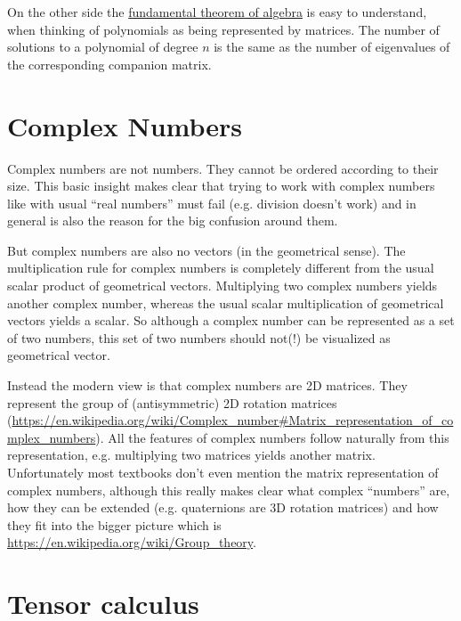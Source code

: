 On the other side the
\href{https://en.wikipedia.org/wiki/Fundamental_theorem_of_algebra}{fundamental
theorem of algebra} is easy to understand, when thinking of polynomials
as being represented by matrices. The number of solutions to a
polynomial of degree $n$ is the same as the number of eigenvalues of
the corresponding companion matrix.

\section{Complex Numbers}
Complex numbers are not numbers. They cannot be ordered according to their size. This basic insight makes clear that trying to work with complex numbers like with usual “real numbers” must fail (e.g. division doesn’t work) and in general is also the reason for the big confusion around them.

But complex numbers are also no vectors (in the geometrical sense). The multiplication rule for complex numbers is completely different from the usual scalar product of geometrical vectors. Multiplying two complex numbers yields another complex number, whereas the usual scalar multiplication of geometrical vectors yields a scalar. So although a complex number can be represented as a set of two numbers, this set of two numbers should not(!) be visualized as geometrical vector.

Instead the modern view is that complex numbers are 2D matrices. They represent the group of (antisymmetric) 2D rotation matrices (\url{https://en.wikipedia.org/wiki/Complex_number#Matrix_representation_of_complex_numbers}). All the features of complex numbers follow naturally from this representation, e.g. multiplying two matrices yields another matrix. Unfortunately most textbooks don’t even mention the matrix representation of complex numbers, although this really makes clear what complex “numbers” are, how they can be extended (e.g. quaternions are 3D rotation matrices) and how they fit into the bigger picture which is \url{https://en.wikipedia.org/wiki/Group_theory}.

\section{Tensor calculus}

